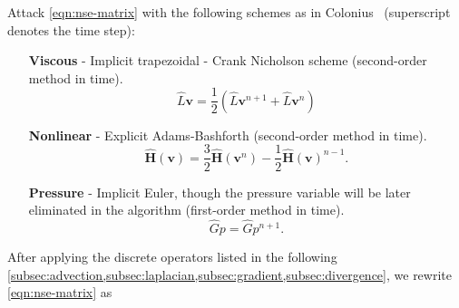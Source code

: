 \documentclass{article}
\numberwithin{equation}{section}
\begin{document}
Attack \cref{eqn:nse-matrix} with the following schemes as in Colonius~\cite{Colonius:2008} (superscript denotes the time step):
\begin{enumerate}
	\item[\textbf{Viscous}] - Implicit trapezoidal - Crank Nicholson scheme (second-order method in time).  
	\begin{equation}\label{eqn:viscous-crank-nicholson}
  		\hat{L}\boldsymbol{v}=\frac{1}{2}\left(\hat{L}\boldsymbol{v}^{n+1}+\hat{L}\boldsymbol{v}^n\right)
	\end{equation}

	\item[\textbf{Nonlinear}] - Explicit Adams-Bashforth (second-order method in time).
	\begin{equation}\label{eqn:nonlinear-adams-bashforth}
		\mathbf{\hat{H}}(\boldsymbol{v}) = \frac{3}{2}\mathbf{\hat{H}}(\boldsymbol{v}^{n}) - \frac{1}{2}\mathbf{\hat{H}}(\boldsymbol{v})^{n-1}.
	\end{equation}

	\item[\textbf{Pressure}] - Implicit Euler, though the pressure variable will be later eliminated in the algorithm (first-order method in time). 
	\begin{equation}\label{eqn:pressure-implicit-euler} 
		\hat{G}p = \hat{G}p^{n+1}.
	\end{equation}
\end{enumerate}

After applying the discrete operators listed in the following \cref{subsec:advection,subsec:laplacian,subsec:gradient,subsec:divergence}, we rewrite \cref{eqn:nse-matrix}  as
\end{document}
